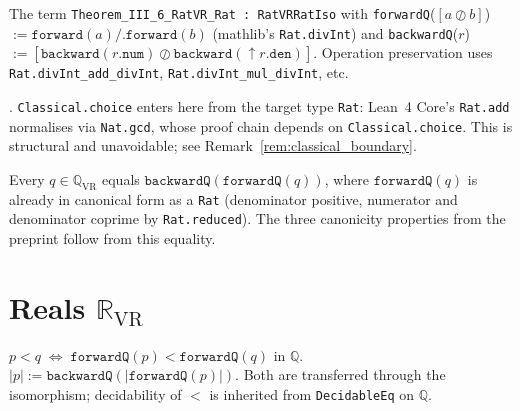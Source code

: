 \begin{theorem}
\label{thm:T_III_6}
\leanok
{}
The term \texttt{Theorem\_III\_6\_RatVR\_Rat : RatVRRatIso} with
\texttt{forwardQ}($[a \oslash b]$) $:= \texttt{forward}(a) \mathbin{/\!\!.} \texttt{forward}(b)$
(mathlib's \texttt{Rat.divInt}) and
\texttt{backwardQ}($r$) $:= [\texttt{backward}(r.\texttt{num}) \oslash \texttt{backward}({\uparrow}r.\texttt{den})]$.
Operation preservation uses \texttt{Rat.divInt\_add\_divInt},
\texttt{Rat.divInt\_mul\_divInt}, etc.

\noindent{}.
\texttt{Classical.choice} enters here from the target type \texttt{Rat}: Lean~4 Core's
\texttt{Rat.add} normalises via \texttt{Nat.gcd}, whose proof chain depends on
\texttt{Classical.choice}.  This is structural and unavoidable; see
Remark~\ref{rem:classical_boundary}.
\end{theorem}

\begin{theorem}
\label{thm:rat_canonical}
\leanok
{}
Every $q \in \mathbb{Q}_{\mathrm{VR}}$ equals
$\texttt{backwardQ}(\texttt{forwardQ}(q))$, where $\texttt{forwardQ}(q)$
is already in canonical form as a \texttt{Rat} (denominator positive,
numerator and denominator coprime by \texttt{Rat.reduced}).
The three canonicity properties from the preprint follow from this equality.
\end{theorem}

\section{Reals $\mathbb{R}_{\mathrm{VR}}$}
\label{sec:reals}

\begin{definition}
\label{def:rat_order}
\leanok
{}
$p < q \;\Longleftrightarrow\; \texttt{forwardQ}(p) < \texttt{forwardQ}(q)$ in $\mathbb{Q}$.
$|p| := \texttt{backwardQ}(|\texttt{forwardQ}(p)|)$.
Both are transferred through the isomorphism; decidability of $<$ is
inherited from \texttt{DecidableEq} on $\mathbb{Q}$.
\end{definition}

